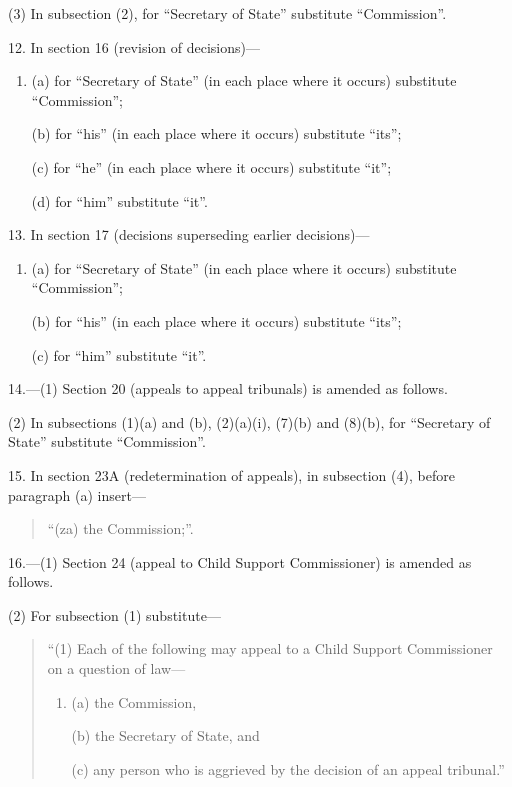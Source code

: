 \documentclass[a4paper]{article}
\begin{document}
(3) In subsection (2), for “Secretary of State” substitute “Commission”.

\medskip

12. In section 16 (revision of decisions)—
\begin{enumerate}\item[]
(a) for “Secretary of State” (in each place where it occurs) substitute “Commission”;

(b) for “his” (in each place where it occurs) substitute “its”;

(c) for “he” (in each place where it occurs) substitute “it”;

(d) for “him” substitute “it”.
\end{enumerate}

\medskip

13. In section 17 (decisions superseding earlier decisions)—
\begin{enumerate}\item[]
(a) for “Secretary of State” (in each place where it occurs) substitute “Commission”;

(b) for “his” (in each place where it occurs) substitute “its”;

(c) for “him” substitute “it”.
\end{enumerate}

\medskip

14.---(1) Section 20 (appeals to appeal tribunals) is amended as follows.

(2) In subsections (1)(a) and (b), (2)(a)(i), (7)(b) and (8)(b), for “Secretary of State” substitute “Commission”.

\medskip

15. In section 23A (redetermination of appeals), in subsection (4), before paragraph (a) insert—
\begin{quotation}
“(za) the Commission;”.
\end{quotation}

\medskip

16.---(1) Section 24 (appeal to Child Support Commissioner) is amended as follows.

(2) For subsection (1) substitute—
\begin{quotation}
“(1) Each of the following may appeal to a Child Support Commissioner on a question of law—
\begin{enumerate}\item[]
(a) the Commission,

(b) the Secretary of State, and

(c) any person who is aggrieved by the decision of an appeal tribunal.”
\end{enumerate}
\end{quotation}
\end{document}

